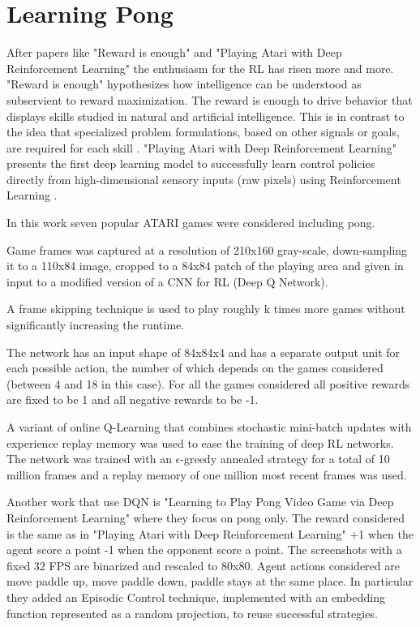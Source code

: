 
\section{Learning Pong}

After papers like "Reward is enough"\cite{silver2021reward} and "Playing Atari with Deep Reinforcement Learning"\cite{mnih2013playing} the enthusiasm for the RL has risen more and more.
"Reward is enough" hypothesizes how intelligence can be understood as subservient to reward maximization. The reward is enough to drive behavior that displays skills studied in natural and artificial intelligence. This is in contrast to the idea that specialized problem formulations, based on other signals or goals, are required for each skill \cite{silver2021reward}.
"Playing Atari with Deep Reinforcement Learning" presents the first deep learning model to successfully learn control policies directly from high-dimensional sensory inputs (raw pixels) using Reinforcement Learning \cite{mnih2013playing}.

In this work seven popular ATARI games were considered including pong.

Game frames was captured at a resolution of 210x160 gray-scale, down-sampling it to a 110x84 image, cropped to a 84x84 patch of the playing area
and given in input to a modified version of a CNN for RL (Deep Q Network).

A frame skipping technique is used to play roughly k times more games without significantly increasing the runtime.

The network has an input shape of 84x84x4 and has a separate output unit for each possible action, the number of which depends on the games considered (between 4 and 18 in this case).
For all the games considered all positive rewards are fixed to be 1 and all negative rewards to be -1.

A variant of online Q-Learning that combines stochastic mini-batch updates with experience replay memory was used to ease the training of deep RL networks.
The network was trained with an $\epsilon$-greedy annealed strategy for a total of 10 million frames and a replay memory of one million most recent frames was used.




Another work that use DQN is "Learning to Play Pong Video Game via Deep Reinforcement Learning" where they focus on pong only.
The reward considered is the same as in "Playing Atari with Deep Reinforcement Learning" +1 when the agent score a point -1 when the opponent score a point.
The screenshots with a fixed 32 FPS are binarized and rescaled to 80x80.
Agent actions considered are move paddle up, move paddle down, paddle stays at the same place.
In particular they added an Episodic Control technique, implemented with an embedding function represented as a random projection, to reuse successful strategies.




